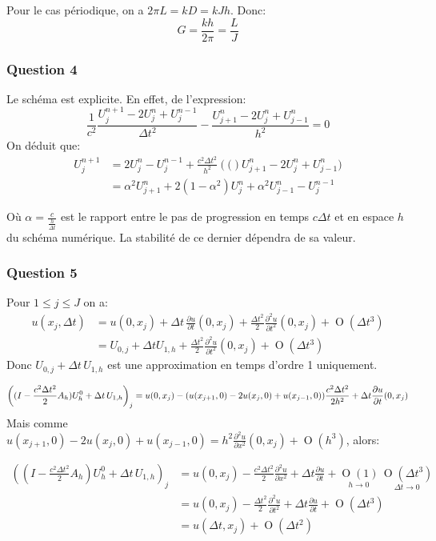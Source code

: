 \documentclass{article}
\newcommand{\BigO}[1]{\ensuremath{\operatorname{O}\left(#1\right)}}
\newcommand{\BBigO}[3]{\ensuremath{\underset{#1 \to #2 }{\operatorname{O}\left(#3\right)}}}
\newcommand{\Wrap}[1]{\ensuremath{\left(#1\right)}}
\newcommand{\Q}[1]{\subsubsection*{Question #1}}
\begin{document}
Pour le cas périodique, on a $2 \pi L = k D = k J h$. Donc:
$$ G = \frac{k h}{2 \pi} = \frac{L}{J}$$

\Q{ 4}
Le schéma est explicite. En effet, de l'expression:
$$ \frac{1}{c^2} \frac{U^{n+1}_{j} - 2U^{n}_{j} + U^{n-1}_{j}}{\Delta t^2} - \frac{U^{n}_{j+1} - 2U^{n}_{j}+U^{n}_{j-1}}{h^2} = 0 $$
On déduit que:
\begin{align*}
	U^{n+1}_{j} &= 2 U^{n}_{j} - U^{n-1}_{j} + \frac{c^2 \Delta t^2 }{h^2} \Wrap( U^{n}_{j+1} - 2U^{n}_{j}+U^{n}_{j-1}) \\
							&= \alpha ^ 2 U^{n}_{j+1} + 2(1-\alpha ^2) U^{n}_{j} + \alpha ^2 U^{n}_{j-1} - U^{n-1}_{j}
\end{align*}

Où $ \alpha = \frac{c}{\frac{h}{ \Delta t }}$ est le rapport entre le pas de progression en temps $c \Delta t$ et en espace $h$ du schéma numérique. La stabilité de ce dernier dépendra de sa valeur.


\Q{5}
Pour $ 1 \leq j \leq J$ on a:
\begin{align*}
u(x_j, \Delta t) 
&= u(0,x_j) + \Delta t \, \frac{\partial u}{\partial t} (0, x_j)  + \frac{\Delta t^2}{2} \frac{\partial^2 u}{\partial t^2} (0, x_j) +  \BigO{\Delta t^3} \\
&= U_{0,j} + \Delta t U_{1,h} + \frac{\Delta t^2}{2} \frac{\partial^2 u}{\partial t^2} (0, x_j) + \BigO{\Delta t^3} 
\end{align*}
Donc $ U_{0,j} + \Delta t \, U_{1,h} $ est une approximation en temps d'ordre 1 uniquement.

$$\left( (I - \frac{c^2 \Delta t^2}{2} A_h ) U^0_h + \Delta t \, U_{1,h} \right )_j 
= u(0, x_j) - (u(x_{j+1}, 0) - 2 u(x_j, 0) + u(x_{j-1}, 0))\frac{c^2 \Delta t^2}{2 h^2} + \Delta t \frac{\partial u}{\partial t} (0, x_j) \\
$$
Mais comme $u(x_{j+1}, 0) - 2 u(x_j, 0) + u(x_{j-1}, 0) = h^2 \frac{\partial^2 u}{\partial x^2} (0, x_j) + \BigO{ h^3}$, alors:

\begin{align*}
\left( (I - \frac{c^2 \Delta t^2}{2} A_h ) U^0_h + \Delta t \, U_{1,h} \right )_j &=
u(0, x_j) - \frac{c^2 \Delta t^2}{2} \frac{\partial^2 u}{\partial x^2}  + \Delta t \frac{\partial u}{\partial t} + \BBigO{h}{0}{1} \, \BBigO{\Delta t}{0}{\Delta t^3} \\
&= u(0, x_j) - \frac{\Delta t^2}{2} \frac{\partial^2 u}{\partial t^2}  + \Delta t \frac{\partial u}{\partial t}  +  \BigO{\Delta t^3} \\
&= u(\Delta t, x_j) + \BigO{\Delta t^2}
\end {align*}
\end{document}
